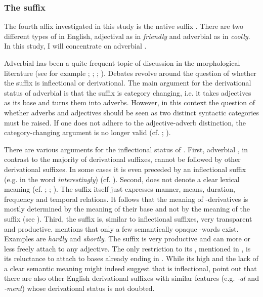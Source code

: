 \subsubsection{The suffix }\label{ly}

The fourth affix investigated in this study is the native suffix . There are two different types of  in English, adjectival  as in \textit{friendly} and adverbial  as in \textit{coolly}. In this study, I will concentrate on adverbial .

Adverbial  has been a quite frequent topic of discussion in the morphological literature (see for example \citealt{Zwicky.1995}; \citealt{Plag.2003}; \citealt{Giegerich.2012}; \citealt{Bauer.2013}). Debates revolve around the question of whether the suffix is inflectional or derivational. 
The main argument for the derivational status of adverbial  is that the suffix is category changing, i.e. it takes adjectives as its base and turns them into adverbs. However, in this context the question of whether adverbs and adjectives should be seen as two distinct syntactic categories must be raised. If one does not adhere to the adjective-adverb distinction, the category-changing argument is no longer valid (cf. \citealt[195]{Plag.2003}; \citealt{Giegerich.2012}).
	
There are various arguments for the inflectional status of . First, adverbial , in contrast to the majority of derivational suffixes, cannot be followed by other derivational suffixes. In some cases it is even preceded by an inflectional suffix (e.g. in the word \textit{interestingly}) (cf. \citealt{Giegerich.2012}).
Second,  does not denote a clear lexical meaning (cf. \citealt[195]{Plag.2003}; \citealt{Giegerich.2012}; \citealt[324]{Bauer.2013}). The suffix itself just expresses manner, means, duration, {frequency} and temporal relations. It follows that the meaning of -derivatives is mostly determined by the meaning of their base and not by the meaning of the suffix (see \citealt[326 f]{Bauer.2013}). 
Third, the suffix  is, similar to inflectional suffixes, very transparent and productive. \citet[196]{Plag.2003} mentions that only a few semantically opaque -words exist. Examples are \textit{hardly} and \textit{shortly}. 
The suffix is very productive and can more or less freely attach to any adjective. The only restriction to its , mentioned in \citet[334]{Bauer.2013}, is its reluctance to attach to bases already ending in .
While its high  and the lack of a clear semantic meaning might indeed suggest that  is inflectional, \citet[324]{Bauer.2013} point out that there are also other English derivational suffixes with similar features (e.g. \textit{-al} and \textit{-ment}) whose derivational status is not doubted. 
 
